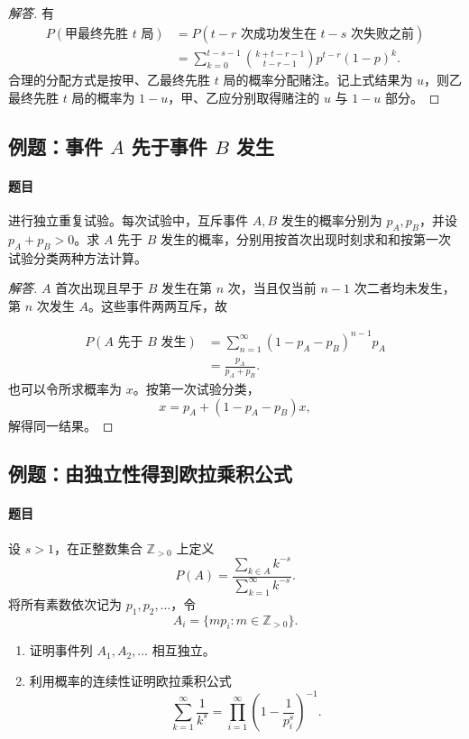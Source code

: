 \begin{proof}[解答]
有
\[
\begin{aligned}
P(\text{甲最终先胜 }t\text{ 局})
&=P(t-r\text{ 次成功发生在 }t-s\text{ 次失败之前})\\
&=\sum_{k=0}^{t-s-1}
\binom{k+t-r-1}{t-r-1}p^{t-r}(1-p)^k.
\end{aligned}
\]
合理的分配方式是按甲、乙最终先胜 $t$ 局的概率分配赌注。记上式结果为 $u$，则乙最终先胜 $t$ 局的概率为 $1-u$，甲、乙应分别取得赌注的 $u$ 与 $1-u$ 部分。
\end{proof}

\subsection{例题：\texorpdfstring{事件 $A$ 先于事件 $B$ 发生}{事件 A 先于事件 B 发生}}\label{note:c1:e29}
\paragraph{题目}
进行独立重复试验。每次试验中，互斥事件 $A,B$ 发生的概率分别为 $p_A,p_B$，并设 $p_A+p_B>0$。求 $A$ 先于 $B$ 发生的概率，分别用按首次出现时刻求和和按第一次试验分类两种方法计算。

\begin{proof}[解答]
$A$ 首次出现且早于 $B$ 发生在第 $n$ 次，当且仅当前 $n-1$ 次二者均未发生，第 $n$ 次发生 $A$。这些事件两两互斥，故

\[
\begin{aligned}
P(A\text{ 先于 }B\text{ 发生})
&=\sum_{n=1}^{\infty}(1-p_A-p_B)^{n-1}p_A\\
&=\frac{p_A}{p_A+p_B}.
\end{aligned}
\]
也可以令所求概率为 $x$。按第一次试验分类，
\[
x=p_A+(1-p_A-p_B)x,
\]
解得同一结果。
\end{proof}

\subsection{例题：由独立性得到欧拉乘积公式}\label{note:c1:e30}
\paragraph{题目}
设 $s>1$，在正整数集合 $\mathbb Z_{>0}$ 上定义
\[
P(A)=\frac{\displaystyle\sum_{k\in A}k^{-s}}
{\displaystyle\sum_{k=1}^{\infty}k^{-s}}.
\]
将所有素数依次记为 $p_1,p_2,\ldots$，令
\[
A_i=\{mp_i:m\in\mathbb Z_{>0}\}.
\]
\begin{enumerate}
\item 证明事件列 $A_1,A_2,\ldots$ 相互独立。
\item 利用概率的连续性证明欧拉乘积公式
\[\sum_{k=1}^{\infty}\frac1{k^s}=\prod_{i=1}^{\infty}\left(1-\frac1{p_i^s}\right)^{-1}.\]
\end{enumerate}

